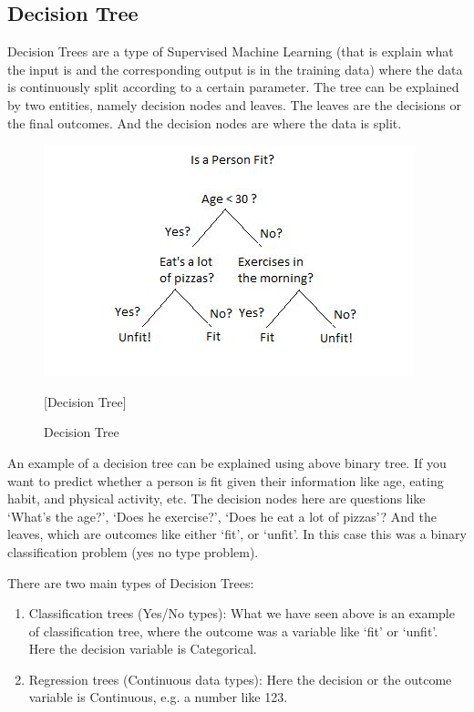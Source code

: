\subsection{Decision Tree}

  Decision Trees are a type of Supervised Machine Learning (that is explain what the input is and the corresponding output is in the training data) where the data is continuously split according to a certain parameter. The tree can be explained by two entities, namely decision nodes and leaves. The leaves are the decisions or the final outcomes. And the decision nodes are where the data is split.
  
    \begin{figure}[h!]  
        \centering
        \includegraphics[scale=0.7]{Figures/decisiontree1.JPG}
        \caption{Decision Tree}[Decision Tree]
        \label{fig:my_label}
    \end{figure}
   
   An example of a decision tree can be explained using above binary tree. If you want to predict whether a person is fit given their information like age, eating habit, and physical activity, etc. The decision nodes here are questions like ‘What’s the age?’, ‘Does he exercise?’, ‘Does he eat a lot of pizzas’? And the leaves, which are outcomes like either ‘fit’, or ‘unfit’. In this case this was a binary classification problem (yes no type problem).
   
   There are two main types of Decision Trees:
   
   \begin{enumerate}
       \item Classification trees (Yes/No types):
       What we have seen above is an example of classification tree, where the outcome was a variable like ‘fit’ or ‘unfit’. Here the decision variable is Categorical.
       \item Regression trees (Continuous data types):
       Here the decision or the outcome variable is Continuous, e.g. a number like 123.
   \end{enumerate}
   
